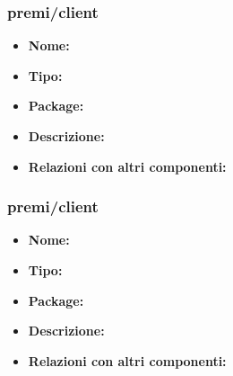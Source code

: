 \subsubsection{premi/client}
\begin{itemize}
  \item[] \textbf{Nome:}
  \item[] \textbf{Tipo:}
  \item[] \textbf{Package:} 
  \item[] \textbf{Descrizione:} 
  \item[] \textbf{Relazioni con altri componenti:} 
\end{itemize}

\subsubsection{premi/client}
\begin{itemize}
  \item[] \textbf{Nome:}
  \item[] \textbf{Tipo:}
  \item[] \textbf{Package:} 
  \item[] \textbf{Descrizione:} 
  \item[] \textbf{Relazioni con altri componenti:} 
\end{itemize}



















